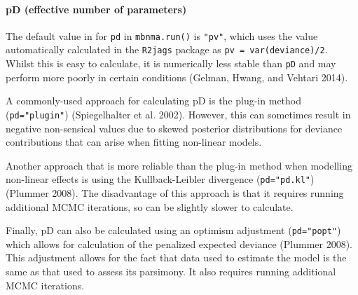 \documentclass[]{article}
\newenvironment{Shaded}{\begin{snugshade}}{\end{snugshade}}
\newcommand{\CommentTok}[1]{\textcolor[rgb]{0.56,0.35,0.01}{\textit{#1}}}
\newcommand{\DataTypeTok}[1]{\textcolor[rgb]{0.13,0.29,0.53}{#1}}
\newcommand{\DecValTok}[1]{\textcolor[rgb]{0.00,0.00,0.81}{#1}}
\newcommand{\KeywordTok}[1]{\textcolor[rgb]{0.13,0.29,0.53}{\textbf{#1}}}
\newcommand{\NormalTok}[1]{#1}
\newcommand{\OperatorTok}[1]{\textcolor[rgb]{0.81,0.36,0.00}{\textbf{#1}}}
\newcommand{\StringTok}[1]{\textcolor[rgb]{0.31,0.60,0.02}{#1}}
\let\oldparagraph\paragraph
\renewcommand{\paragraph}[1]{\oldparagraph{#1}\mbox{}}
\begin{document}
\begin{Shaded}
\end{Shaded}

\hypertarget{pd-effective-number-of-parameters}{%
\paragraph{pD (effective number of
parameters)}\label{pd-effective-number-of-parameters}}

The default value in for \texttt{pd} in \texttt{mbnma.run()} is
\texttt{"pv"}, which uses the value automatically calculated in the
\texttt{R2jags} package as \texttt{pv\ =\ var(deviance)/2}. Whilst this
is easy to calculate, it is numerically less stable than \texttt{pD} and
may perform more poorly in certain conditions (Gelman, Hwang, and
Vehtari 2014).

A commonly-used approach for calculating pD is the plug-in method
(\texttt{pd="plugin"}) (Spiegelhalter et al. 2002). However, this can
sometimes result in negative non-sensical values due to skewed posterior
distributions for deviance contributions that can arise when fitting
non-linear models.

Another approach that is more reliable than the plug-in method when
modelling non-linear effects is using the Kullback-Leibler divergence
(\texttt{pd="pd.kl"}) (Plummer 2008). The disadvantage of this approach
is that it requires running additional MCMC iterations, so can be
slightly slower to calculate.

Finally, pD can also be calculated using an optimism adjustment
(\texttt{pd="popt"}) which allows for calculation of the penalized
expected deviance (Plummer 2008). This adjustment allows for the fact
that data used to estimate the model is the same as that used to assess
its parsimony. It also requires running additional MCMC iterations.
\end{document}
